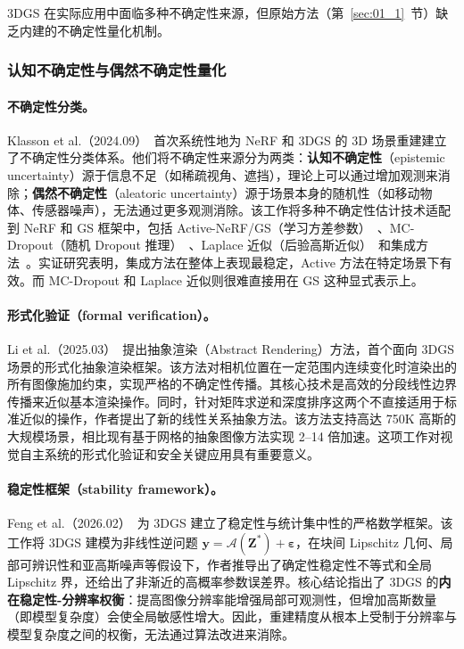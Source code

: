 3DGS 在实际应用中面临多种不确定性来源，但原始方法（第~\ref{sec:01_1}~节）缺乏内建的不确定性量化机制。

\subsubsection{认知不确定性与偶然不确定性量化}

\paragraph{不确定性分类。} Klasson et al.（2024.09）~\cite{2409_06407}首次系统性地为 NeRF 和 3DGS 的 3D 场景重建建立了不确定性分类体系。他们将不确定性来源分为两类：\textbf{认知不确定性}（epistemic uncertainty）源于信息不足（如稀疏视角、遮挡），理论上可以通过增加观测来消除；\textbf{偶然不确定性}（aleatoric uncertainty）源于场景本身的随机性（如移动物体、传感器噪声），无法通过更多观测消除。该工作将多种不确定性估计技术适配到 NeRF 和 GS 框架中，包括 Active-NeRF/GS（学习方差参数）~\cite{pan2022activenerf}、MC-Dropout（随机 Dropout 推理）~\cite{gal2016dropout}、Laplace 近似（后验高斯近似）~\cite{daxberger2021laplace}和集成方法~\cite{lakshminarayanan2017ensemble}。实证研究表明，集成方法在整体上表现最稳定，Active 方法在特定场景下有效。而 MC-Dropout 和 Laplace 近似则很难直接用在 GS 这种显式表示上。

\paragraph{形式化验证（formal verification）。} Li et al.（2025.03）~\cite{2503_00308}提出抽象渲染（Abstract Rendering）方法，首个面向 3DGS 场景的形式化抽象渲染框架。该方法对相机位置在一定范围内连续变化时渲染出的所有图像施加约束，实现严格的不确定性传播。其核心技术是高效的分段线性边界传播来近似基本渲染操作。同时，针对矩阵求逆和深度排序这两个不直接适用于标准近似的操作，作者提出了新的线性关系抽象方法。该方法支持高达 750K 高斯的大规模场景，相比现有基于网格的抽象图像方法实现 2--14 倍加速。这项工作对视觉自主系统的形式化验证和安全关键应用具有重要意义。

\paragraph{稳定性框架（stability framework）。} Feng et al.（2026.02）~\cite{2602_09415}为 3DGS 建立了稳定性与统计集中性的严格数学框架。该工作将 3DGS 建模为非线性逆问题 $\mathbf{y} = \mathcal{A}(\mathbf{Z}^*) + \boldsymbol{\varepsilon}$，在块间 Lipschitz 几何、局部可辨识性和亚高斯噪声等假设下，作者推导出了确定性稳定性不等式和全局 Lipschitz 界，还给出了非渐近的高概率参数误差界。核心结论指出了 3DGS 的\textbf{内在稳定性-分辨率权衡}：提高图像分辨率能增强局部可观测性，但增加高斯数量（即模型复杂度）会使全局敏感性增大。因此，重建精度从根本上受制于分辨率与模型复杂度之间的权衡，无法通过算法改进来消除。

